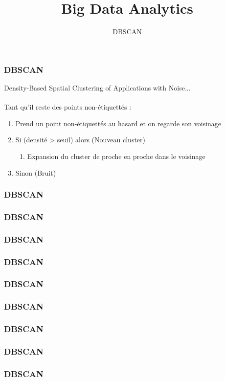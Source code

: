 \documentclass{formation}
\title{Big Data Analytics}
\subtitle{DBSCAN}
\begin{document}
\maketitle

\begin{frame}
  \frametitle{DBSCAN}
  Density-Based Spatial Clustering of Applications with Noise...\\
  \\
  Tant qu'il reste des points non-étiquettés : \\
  \begin{enumerate}
  \item Prend un point non-étiquettés au hasard et on regarde son voisinage
  \item Si (densité > seuil) alors (Nouveau cluster)
    \begin{enumerate}
    \item Expansion du cluster de proche en proche dans le voisinage
    \end{enumerate}
  \item Sinon (Bruit)
  \end{enumerate}
\end{frame}

\begin{frame}
  \frametitle{DBSCAN}
\end{frame}

\begin{frame}
  \frametitle{DBSCAN}
\end{frame}

\begin{frame}
  \frametitle{DBSCAN}
\end{frame}

\begin{frame}
  \frametitle{DBSCAN}
\end{frame}

\begin{frame}
  \frametitle{DBSCAN}
\end{frame}

\begin{frame}
  \frametitle{DBSCAN}
\end{frame}

\begin{frame}
  \frametitle{DBSCAN}
\end{frame}

\begin{frame}
  \frametitle{DBSCAN}
\end{frame}

\begin{frame}
  \frametitle{DBSCAN}
\end{frame}
\end{document}
